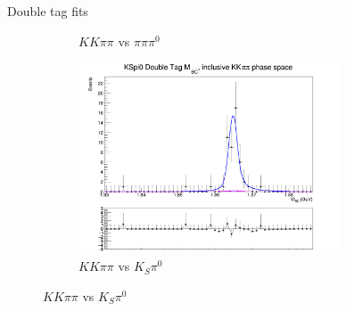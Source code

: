 \documentclass{beamer}
\begin{document}
\begin{frame}{Double tag fits}
\begin{figure}
\begin{subfigure}{0.5\textwidth}
      \caption{$KK\pi\pi$ vs $\pi\pi\pi^0$}
    \end{subfigure}%
    \begin{subfigure}{0.5\textwidth}
      \centering
      \includegraphics[width=0.85\textwidth]{Plots/DoubleTagYield_DoubleTag_CP_KKpipi_vs_KSpi0_SignalBin0.png}
      \caption{$KK\pi\pi$ vs $K_S\pi^0$}
    \end{subfigure}
  \end{figure}
\end{frame}
\end{document}
